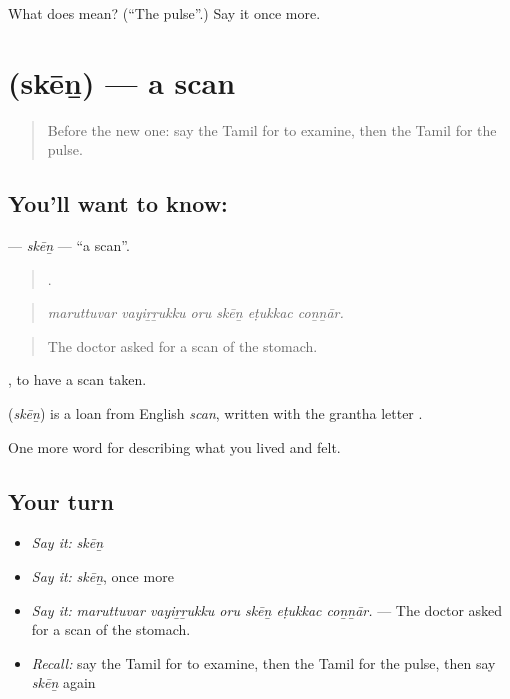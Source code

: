 \begin{tcolorbox}[breakable,colback=teal!4,colframe=teal!35!black,title={Before you move on}]
What does  mean? (\textquotedblleft{}The pulse\textquotedblright{}.) Say it once more.
\end{tcolorbox}
\section[\texorpdfstring{\ta{ஸ்கேன்} (skēṉ)}{ஸ்கேன் (skēṉ)}]{ (skēṉ) — a scan}

\label{lesson:TA-C475-sken}



\begin{quote}
Before the new one: say the Tamil for to examine, then the Tamil for the pulse.
\end{quote}

\subsection*{You'll want to know: }
\textbf{} — \emph{skēṉ} — \textquotedblleft{}a scan\textquotedblright{}.

\begin{quote}
     .
\end{quote}

\begin{quote}
\emph{maruttuvar vayiṟṟukku oru skēṉ eṭukkac coṉṉār.}
\end{quote}

\begin{quote}
The doctor asked for a scan of the stomach.
\end{quote}

 , to have a scan taken.

\begin{cousinweb}
\textbf{} (\emph{skēṉ}) is a loan from English \emph{scan}, written with the grantha letter .
\end{cousinweb}

\begin{grammarlens}[title={What you've built}]
One more word for describing what you lived and felt.
\end{grammarlens}

\subsection*{Your turn}
\begin{itemize}
\raggedright
  \item \emph{Say it:} \emph{skēṉ}
  \item \emph{Say it:} \emph{skēṉ}, once more
  \item \emph{Say it:} \emph{maruttuvar vayiṟṟukku oru skēṉ eṭukkac coṉṉār.} — The doctor asked for a scan of the stomach.
  \item \emph{Recall:} say the Tamil for to examine, then the Tamil for the pulse, then say \emph{skēṉ} again
\end{itemize}

